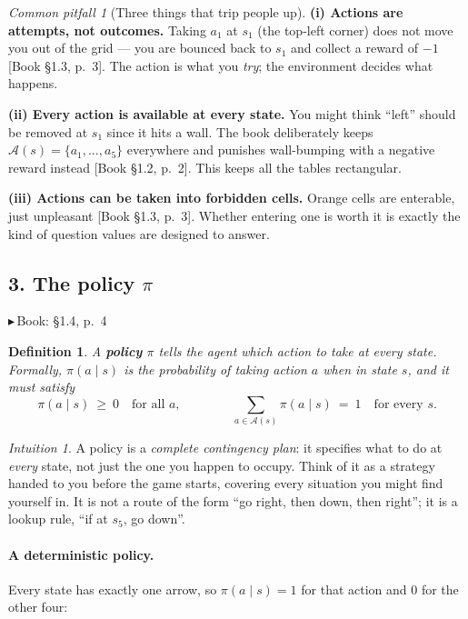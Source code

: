 \documentclass[11pt, letterpaper]{article}
\theoremstyle{runin}
\newtheorem*{definition}{Definition}
\theoremstyle{runinplain}
\theoremstyle{remark}
\newtheorem*{warning}{Common pitfall}
\newtheorem*{intuition}{Intuition}
\newcommand{\Aspace}{\mathcal{A}}
\newcommand{\bk}[1]{{\color{bookblue}\small$\blacktriangleright$\,\textsf{Book: #1}}}
\newcommand{\bkin}[1]{{\color{bookblue}\small[\textsf{Book #1}]}}
\begin{document}
\begin{warning}[Three things that trip people up]
\textbf{(i) Actions are attempts, not outcomes.} Taking $a_1$ at $s_1$ (the top-left
corner) does not move you out of the grid --- you are bounced back to $s_1$ and
collect a reward of $-1$ \bkin{\S1.3, p.~3}. The action is what you \emph{try}; the
environment decides what happens.

\textbf{(ii) Every action is available at every state.} You might think ``left''
should be removed at $s_1$ since it hits a wall. The book deliberately keeps
$\Aspace(s)=\{a_1,\dots,a_5\}$ everywhere and punishes wall-bumping with a negative
reward instead \bkin{\S1.2, p.~2}. This keeps all the tables rectangular.

\textbf{(iii) Actions can be taken into forbidden cells.} Orange cells are enterable,
just unpleasant \bkin{\S1.3, p.~3}. Whether entering one is worth it is exactly the
kind of question values are designed to answer.
\end{warning}

\subsection*{3. The policy $\pi$}

\bk{\S1.4, p.~4}

\begin{definition}
A \textbf{policy} $\pi$ tells the agent which action to take at every state.
Formally, $\pi(a\mid s)$ is the probability of taking action $a$ when in state $s$,
and it must satisfy
\[
  \pi(a\mid s)\ \ge\ 0 \quad\text{for all } a,
  \qquad\qquad
  \sum_{a\in\Aspace(s)}\pi(a\mid s)\ =\ 1
  \quad\text{for every } s .
\]
\end{definition}

\begin{intuition}
A policy is a \emph{complete contingency plan}: it specifies what to do at
\emph{every} state, not just the one you happen to occupy. Think of it as a strategy
handed to you before the game starts, covering every situation you might find
yourself in. It is not a route of the form ``go right, then down, then right''; it is
a lookup rule, ``if at $s_5$, go down''.
\end{intuition}

\paragraph{A deterministic policy.} Every state has exactly one arrow, so
$\pi(a\mid s)=1$ for that action and $0$ for the other four:
\end{document}
